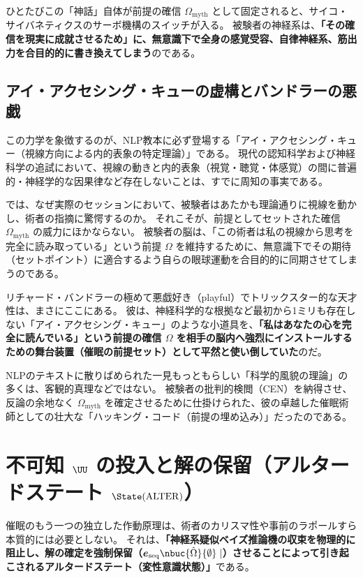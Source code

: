 ひとたびこの「神話」自体が前提の確信 $\Omega_{\mathrm{myth}}$ として固定されると、サイコ・サイバネティクスのサーボ機構のスイッチが入る。
被験者の神経系は、\textbf{「その確信を現実に成就させるため」に、無意識下で全身の感覚受容、自律神経系、筋出力を合目的的に書き換えてしまう}のである。

\subsection{アイ・アクセシング・キューの虚構とバンドラーの悪戯}
この力学を象徴するのが、NLP教本に必ず登場する「アイ・アクセシング・キュー（視線方向による内的表象の特定理論）」である。
現代の認知科学および神経科学の追試において、視線の動きと内的表象（視覚・聴覚・体感覚）の間に普遍的・神経学的な因果律など存在しないことは、すでに周知の事実である。

では、なぜ実際のセッションにおいて、被験者はあたかも理論通りに視線を動かし、術者の指摘に驚愕するのか。
それこそが、前提としてセットされた確信 $\Omega_{\mathrm{myth}}$ の威力にほかならない。
被験者の脳は、「この術者は私の視線から思考を完全に読み取っている」という前提 $\Omega$ を維持するために、無意識下でその期待（セットポイント）に適合するよう自らの眼球運動を合目的的に同期させてしまうのである。

リチャード・バンドラーの極めて悪戯好き（playful）でトリックスター的な天才性は、まさにここにある。
彼は、神経科学的な根拠など最初から1ミリも存在しない「アイ・アクセシング・キュー」のような小道具を、\textbf{「私はあなたの心を完全に読んでいる」という前提の確信 $\Omega$ を相手の脳内へ強烈にインストールするための舞台装置（催眠の前提セット）として平然と使い倒していた}のだ。

NLPのテキストに散りばめられた一見もっともらしい「科学的風貌の理論」の多くは、客観的真理などではない。
被験者の批判的検閲（CEN）を納得させ、反論の余地なく $\Omega_{\mathrm{myth}}$ を確定させるために仕掛けられた、彼の卓越した催眠術師としての壮大な「ハッキング・コード（前提の埋め込み）」だったのである。

\section{不可知 $\UU$ の投入と解の保留（アルタードステート $\State(\mathrm{ALTER})$）}

催眠のもう一つの独立した作動原理は、術者のカリスマ性や事前のラポールすら本質的には必要としない。
それは、\textbf{「神経系疑似ベイズ推論機の収束を物理的に阻止し、解の確定を強制保留（$\boldsymbol{e}_{\mathrm{seq}} \nbuc{\hat{\Omega}}{\emptyset} \mid$）させることによって引き起こされるアルタードステート（変性意識状態）」}である。


